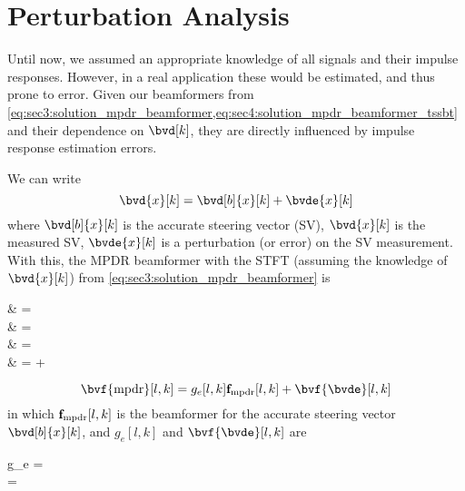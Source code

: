 \section{Perturbation Analysis}

Until now, we assumed an appropriate knowledge of all signals and their impulse responses. However, in a real application these would be estimated, and thus prone to error. Given our beamformers from \cref{eq:sec3:solution_mpdr_beamformer,eq:sec4:solution_mpdr_beamformer_tssbt} and their dependence on $\bvd[k]$, they are directly influenced by impulse response estimation errors.

We can write
\begin{equation}
	\bvd{x}[k] = \bvd[b]{x}[k] + \bvde{x}[k]
\end{equation}
where $\bvd[b]{x}[k]$ is the accurate steering vector (SV), $\bvd{x}[k]$ is the measured SV, $\bvde{x}[k]$ is a perturbation (or error) on the SV measurement. With this, the MPDR beamformer with the STFT (assuming the knowledge of $\bvd{x}[k]$) from \cref{eq:sec3:solution_mpdr_beamformer} is
\begin{equations}
	\bvf{\mpdr}
	& =  \\
	& =  \\
	& =  \\
	& =  + 
\end{equations}
\begin{equation}
	\label{eq:sec5:beamformer_approx_sv}
	\bvf{\mpdr}[l,k] = g_e[l,k] \bvfb{\mpdr}[l,k] + \bvf{\bvde}[l,k]
\end{equation}
in which $\bvfb{\mpdr}[l,k]$ is the beamformer for the accurate steering vector $\bvd[b]{x}[k]$, and $g_e[l,k]$ and $\bvf{\bvde}[l,k]$ are
\begin{subgather}
	g_e =  \\
	\bvf{\bvde} = 
\end{subgather}

